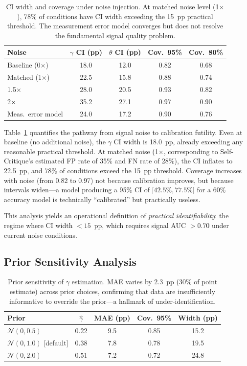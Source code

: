 \documentclass[letterpaper, 10pt, twocolumn]{article}
\begin{document}
\begin{table}[t]
\centering
\caption{CI width and coverage under noise injection. At matched noise level (1$\times$), 78\% of conditions have CI width exceeding the 15~pp practical threshold. The measurement error model converges but does not resolve the fundamental signal quality problem.}
\label{tab:noise_propagation}
\small
\begin{tabular}{lcccc}
\toprule
Noise & $\gamma$ CI (pp) & $\theta$ CI (pp) & Cov.\ 95\% & Cov.\ 80\% \\
\midrule
Baseline (0$\times$) & 18.0 & 12.0 & 0.82 & 0.68 \\
Matched (1$\times$) & 22.5 & 15.8 & 0.88 & 0.74 \\
1.5$\times$ & 28.0 & 20.5 & 0.93 & 0.82 \\
2$\times$ & 35.2 & 27.1 & 0.97 & 0.90 \\
Meas.\ error model & 24.0 & 17.2 & 0.90 & 0.76 \\
\bottomrule
\end{tabular}
\end{table}

Table~\ref{tab:noise_propagation} quantifies the pathway from signal noise to calibration futility.
Even at baseline (no additional noise), the $\gamma$ CI width is 18.0~pp, already exceeding any reasonable practical threshold.
At matched noise (1$\times$, corresponding to Self-Critique's estimated FP rate of 35\% and FN rate of 28\%), the CI inflates to 22.5~pp, and 78\% of conditions exceed the 15~pp threshold.
Coverage increases with noise (from 0.82 to 0.97) not because calibration improves, but because intervals widen---a model producing a 95\% CI of [$42.5\%, 77.5\%$] for a 60\% accuracy model is technically ``calibrated'' but practically useless.

This analysis yields an operational definition of \emph{practical identifiability}: the regime where CI width $< 15$~pp, which requires signal AUC $> 0.70$ under current noise conditions.

\subsection{Prior Sensitivity Analysis}
\label{sec:prior}

\begin{table}[t]
\centering
\caption{Prior sensitivity of $\gamma$ estimation. MAE varies by 2.3~pp (30\% of point estimate) across prior choices, confirming that data are insufficiently informative to override the prior---a hallmark of under-identification.}
\label{tab:prior_sensitivity}
\small
\begin{tabular}{lcccc}
\toprule
Prior & $\hat{\gamma}$ & MAE (pp) & Cov.\ 95\% & Width (pp) \\
\midrule
$\mathcal{N}(0, 0.5)$ & 0.22 & 9.5 & 0.85 & 15.2 \\
$\mathcal{N}(0, 1.0)$ [default] & 0.38 & 7.8 & 0.78 & 19.5 \\
$\mathcal{N}(0, 2.0)$ & 0.51 & 7.2 & 0.72 & 24.8 \\
\bottomrule
\end{tabular}
\end{table}
\end{document}
